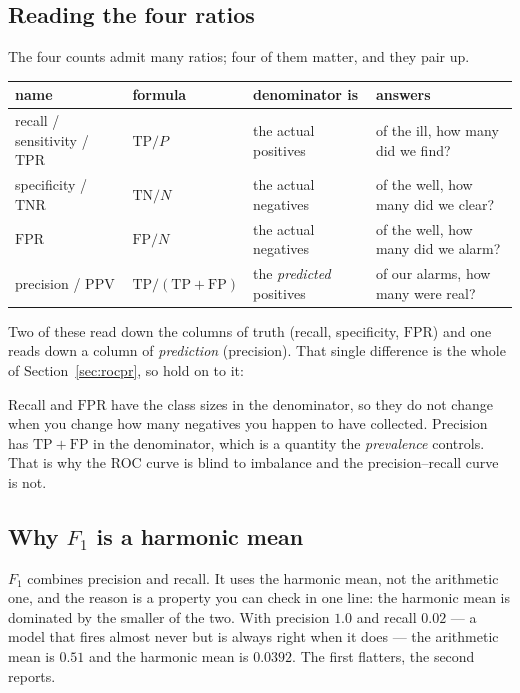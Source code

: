 \documentclass[11pt]{article}
\newcommand{\TP}{\mathrm{TP}}
\newcommand{\FP}{\mathrm{FP}}
\newcommand{\TN}{\mathrm{TN}}
\newcommand{\TPR}{\mathrm{TPR}}
\newcommand{\FPR}{\mathrm{FPR}}
\begin{document}
\subsection{Reading the four ratios}

The four counts admit many ratios; four of them matter, and they pair up.

\begin{center}\small
\begin{tabular}{@{}llll@{}}
\toprule
name & formula & denominator is & answers\\
\midrule
recall / sensitivity / $\TPR$ & $\TP/P$ & the actual positives & of the ill, how many did we find?\\
specificity / $\mathrm{TNR}$ & $\TN/N$ & the actual negatives & of the well, how many did we clear?\\
$\FPR$ & $\FP/N$ & the actual negatives & of the well, how many did we alarm?\\
precision / PPV & $\TP/(\TP+\FP)$ & the \emph{predicted} positives & of our alarms, how many were real?\\
\bottomrule
\end{tabular}
\end{center}

Two of these read down the columns of truth (recall, specificity, $\FPR$) and
one reads down a column of \emph{prediction} (precision). That single difference
is the whole of Section~\ref{sec:rocpr}, so hold on to it:

\begin{keyidea}
Recall and $\FPR$ have the class sizes in the denominator, so they do not change
when you change how many negatives you happen to have collected. Precision has
$\TP + \FP$ in the denominator, which is a quantity the \emph{prevalence}
controls. That is why the ROC curve is blind to imbalance and the
precision--recall curve is not.
\end{keyidea}

\subsection{Why $F_1$ is a harmonic mean}

$F_1$ combines precision and recall. It uses the harmonic mean, not the
arithmetic one, and the reason is a property you can check in one line: the
harmonic mean is dominated by the smaller of the two. With precision $1.0$ and
recall $0.02$ --- a model that fires almost never but is always right when it
does --- the arithmetic mean is $0.51$ and the harmonic mean is $0.0392$. The
first flatters, the second reports.
\end{document}
